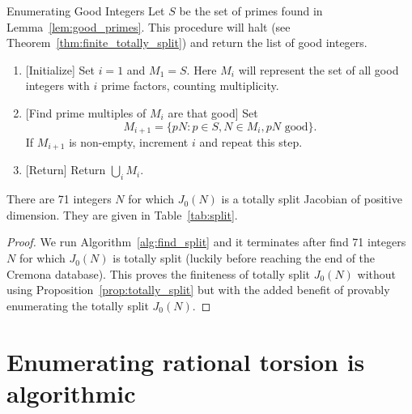 \begin{algorithm}{Enumerating Good Integers}
    \label{alg:find_split}
    Let $S$ be the set of primes found in Lemma~\ref{lem:good_primes}. This
    procedure will halt (see Theorem~\ref{thm:finite_totally_split}) and return
    the list of good integers.
\end{algorithm}
\begin{enumerate}
    \item{} [Initialize]
        \label{step:initialize}
        Set $i=1$ and $M_1=S$. Here $M_i$ will represent the set of all good
        integers with $i$ prime factors, counting multiplicity.
    \item{} [Find prime multiples of $M_i$ are that good]
        Set
        \[
            M_{i+1}=\{pN: p\in S, N\in M_i, pN \text{ good}\}.
        \]
        If $M_{i+1}$ is non-empty, increment $i$ and repeat this step.
    \item{} [Return]
        Return $\bigcup_i M_i$.
\end{enumerate}
\begin{theorem}
    \label{thm:finite_totally_split}
    There are 71 integers $N$ for which $J_0(N)$ is a totally split Jacobian of
    positive dimension. They are given in Table~\ref{tab:split}.
\end{theorem}
\begin{proof}
    We run Algorithm~\ref{alg:find_split} and it terminates after find 71
    integers $N$ for which $J_0(N)$ is totally split (luckily before reaching
    the end of the Cremona database). This proves the finiteness of totally
    split $J_0(N)$ without using Proposition~\ref{prop:totally_split} but with
    the added benefit of provably enumerating the totally split $J_0(N)$.
\end{proof}


\section{Enumerating rational torsion is algorithmic}

